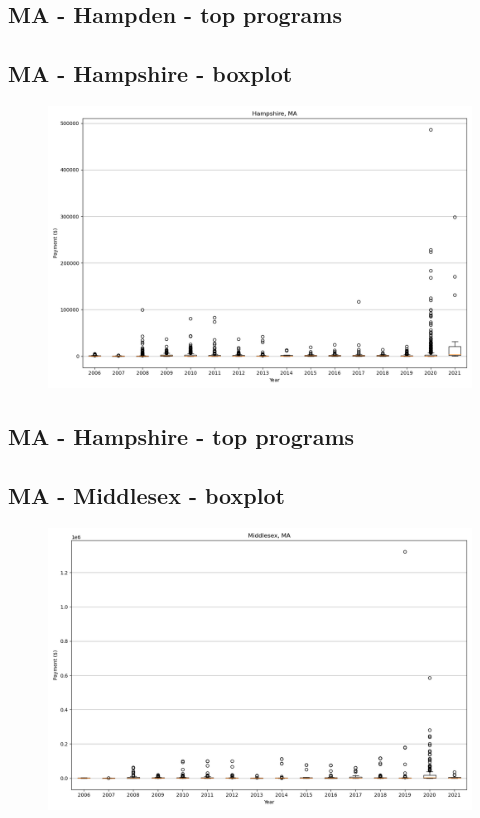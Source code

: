\subsection*{MA - Hampden - top programs}

\newpage
\subsection*{MA - Hampshire - boxplot}
\begin{figure}[h]
\centering
\includegraphics[width=7in]{../output/boxplots/counties/Hampshire-MA_boxplot.png}
\end{figure}


\subsection*{MA - Hampshire - top programs}

\newpage
\subsection*{MA - Middlesex - boxplot}
\begin{figure}[h]
\centering
\includegraphics[width=7in]{../output/boxplots/counties/Middlesex-MA_boxplot.png}
\end{figure}



